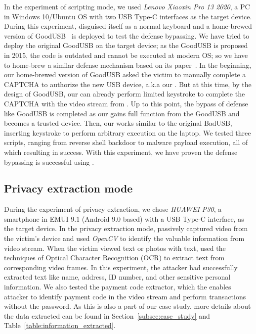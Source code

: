 In the experiment of scripting mode, we used \textit{Lenovo Xiaoxin Pro 13
2020}, a PC in Windows 10/Ubuntu OS with two USB Type-C interfaces as the
target device.  During this experiment, \tool disguised itself as a normal
keyboard and a home-brewed version of GoodUSB~\cite{tian2015defending} is
deployed to test the defense bypassing. We have tried to deploy the original
GoodUSB on the target device; as the GoodUSB is proposed in 2015, the code is
outdated and cannot be executed at modern OS; so we have to home-brew a similar
defense mechanism based on its paper~\cite{tian2015defending}.  In the
beginning, our home-brewed version of GoodUSB asked the victim to manually complete
a CAPTCHA to authorize the new USB device, a.k.a our \tool. But at this time,
by the design of GoodUSB,  our \tool can already perform limited keystroke to complete the
CAPTCHA with the video stream from \tool. Up
to this point, the bypass of defense like GoodUSB is completed as our \tool
gains full function from the GoodUSB and becomes a trusted device. Then, our
\tool works similar to the original BadUSB, inserting keystroke to perform
arbitrary execution on the laptop. We tested three scripts, ranging from
reverse shell backdoor to malware payload execution, all of which resulting in
success.  With this experiment, we have proven the defense bypassing is successful
using \tool.



\subsection{Privacy extraction mode}

During the experiment of privacy extraction, we chose \textit{HUAWEI P30}, a
smartphone in EMUI 9.1 (Android 9.0 based) with a USB Type-C interface, as the
target device.  In the privacy extraction mode, \tool passively captured video
from the victim's device and used \textit{OpenCV} to identify the valuable
information from video stream.  When the victim viewed text or photos with
text, \tool used the techniques of Optical Character Recognition (OCR) to
extract text from corresponding video frames.  In this experiment, the attacker had
successfully extracted text like name, address, ID number, and other sensitive
personal information. We also tested the payment code extractor, which the enables
attacker to identify payment code in the video stream and perform transactions
without the password. As this is also a part of our case study, more details about
the data extracted can be found in Section~\ref{subsec:case_study} and
Table~\ref{table:information_extracted}.

